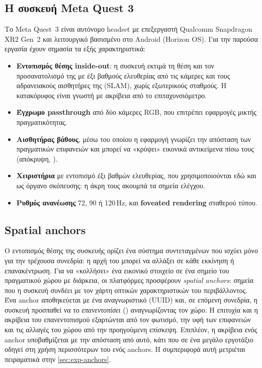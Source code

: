 \subsection{Η συσκευή Meta Quest 3}
\label{sec:bg-quest}

Το Meta Quest~3 είναι αυτόνομο headset με επεξεργαστή Qualcomm Snapdragon XR2 Gen~2 και λειτουργικό βασισμένο στο Android (Horizon OS). Για την παρούσα εργασία έχουν σημασία τα εξής χαρακτηριστικά:
\begin{itemize}
  \item \textbf{Εντοπισμός θέσης inside-out}: η συσκευή εκτιμά τη θέση και τον προσανατολισμό της με έξι βαθμούς ελευθερίας από τις κάμερες και τους αδρανειακούς αισθητήρες της (SLAM), χωρίς εξωτερικούς σταθμούς. Η κατακόρυφος είναι γνωστή με ακρίβεια από το επιταχυνσιόμετρο.
  \item \textbf{Έγχρωμο passthrough} από δύο κάμερες RGB, που επιτρέπει εφαρμογές μικτής πραγματικότητας.
  \item \textbf{Αισθητήρας βάθους}, μέσω του οποίου η εφαρμογή γνωρίζει την απόσταση των πραγματικών επιφανειών και μπορεί να «κρύψει» εικονικά αντικείμενα πίσω τους (απόκρυψη, ).
  \item \textbf{Χειριστήρια} με εντοπισμό έξι βαθμών ελευθερίας, που χρησιμοποιούνται εδώ και ως όργανο σκόπευσης: η άκρη τους ακουμπά τα σημεία ελέγχου.
  \item \textbf{Ρυθμός ανανέωσης} 72, 90 ή 120\,Hz, και \textbf{foveated rendering} σταθερού τύπου.
\end{itemize}


\subsection{Spatial anchors}
\label{sec:bg-anchors}

Ο εντοπισμός θέσης της συσκευής ορίζει ένα σύστημα συντεταγμένων που ισχύει μόνο για την τρέχουσα συνεδρία: η αρχή του μπορεί να αλλάξει σε κάθε εκκίνηση ή επανακέντρωση. Για να «κολλήσει» ένα εικονικό στοιχείο σε ένα σημείο του πραγματικού χώρου με διάρκεια, οι πλατφόρμες προσφέρουν \emph{spatial anchors}: σημεία που η συσκευή συνδέει με τον χάρτη οπτικών χαρακτηριστικών του περιβάλλοντος. Ένα anchor αποθηκεύεται με ένα αναγνωριστικό (UUID) και, σε επόμενη συνεδρία, η συσκευή προσπαθεί να το \emph{επανεντοπίσει} () αναγνωρίζοντας τον χώρο. Η επιτυχία και η ακρίβεια του επανεντοπισμού εξαρτώνται από τον φωτισμό, την υφή των επιφανειών και τις αλλαγές του χώρου από την προηγούμενη επίσκεψη. Επιπλέον, η ακρίβεια ενός anchor υποβαθμίζεται με την απόσταση από αυτό, κάτι που σε ένα μεγάλο εργοτάξιο οδηγεί στη χρήση περισσότερων του ενός anchors. Η συμπεριφορά αυτή μετριέται πειραματικά στην \cref{sec:exp-anchors}.

